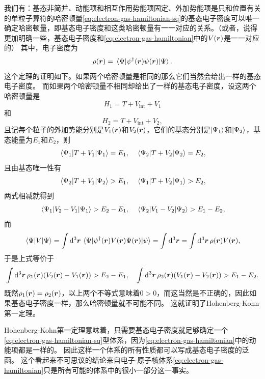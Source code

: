 我们有：基态非简并、动能项和相互作用势能项固定、外加势能项是只和位置有关的单粒子算符的哈密顿量\eqref{eq:electron-gas-hamiltonian-sq}的基态电子密度可以唯一确定哈密顿量，即基态电子密度和这类哈密顿量有一一对应的关系。（或者，说得更加明确一些，基态电子密度和\eqref{eq:electron-gas-hamiltonian}中的$V(\vb*{r})$是一一对应的）
其中，电子密度为
\begin{equation}
    \rho(\vb*{r}) = \mel{\Psi}{{\psi}^\dagger(\vb*{r}) {\psi}(\vb*{r})}{\Psi}.
\end{equation}
这个定理的证明如下。如果两个哈密顿量是相同的那么它们当然会给出一样的基态电子密度。
而如果两个哈密顿量不相同却给出了一样的基态电子密度，设这两个哈密顿量是
\[
    {H}_1 = {T} + {V}_\text{int} + {V}_1
\]
和
\[
    {H}_2 = {T} + {V}_\text{int} + {V}_2,
\]
且记每个粒子的外加势能分别是$V_1(\vb*{r})$和$V_2(\vb*{r})$，它们的基态分别是$\ket{\Psi_1}$和$\ket{\Psi_2}$，基态能量为$E_1$和$E_2$，则
\[
    \mel{\Psi_1}{{T} + {V}_1}{\Psi_1} = E_1, \quad \mel{\Psi_2}{{T} + {V}_2}{\Psi_2} = E_2,
\]
且由基态唯一性有
\[
    \mel{\Psi_2}{{T} + {V}_1}{\Psi_2} > E_1, \quad \mel{\Psi_1}{{T} + {V}_2}{\Psi_1} > E_2,
\]
两式相减就得到
\[
    \mel{\Psi_1}{{V}_2 - {V}_1}{\Psi_1} > E_2 - E_1, \quad \mel{\Psi_2}{{V}_1 - {V}_2}{\Psi_2} > E_1 - E_2,
\]
而
\[
    \mel{\Psi}{{V}}{\Psi} = \int \dd[3]{\vb*{r}} \mel{\Psi}{{\psi}^\dagger(\vb*{r}) V(\vb*{r}) {\Psi}(\vb*{r})}{\psi} = \int \dd[3]{\vb*{r}} = \int \dd[3]{\vb*{r}} \rho(\vb*{r}) V(\vb*{r}),
\]
于是上式等价于
\[
    \int \dd[3]{\vb*{r}} \rho_1(\vb*{r}) (V_2(\vb*{r}) - V_1(\vb*{r})) > E_2 - E_1, \quad \int \dd[3]{\vb*{r}} \rho_2(\vb*{r}) (V_1(\vb*{r}) - V_2(\vb*{r})) > E_1 - E_2.
\]
既然$\rho_1(\vb*{r}) = \rho_2(\vb*{r})$，以上两个不等式意味着$0 > 0$，而这当然是不正确的，因此如果基态电子密度一样，那么哈密顿量就不可能不同。
这就证明了Hohenberg-Kohn第一定理。

Hohenberg-Kohn第一定理意味着，只需要基态电子密度就足够确定一个\eqref{eq:electron-gas-hamiltonian-sq}型体系，因为\eqref{eq:electron-gas-hamiltonian}中的动能项都是一样的。
因此这样一个体系的所有性质都可以写成基态电子密度的泛函。
这个看起来不可思议的结论来自电子-原子核体系\eqref{eq:electron-gas-hamiltonian}只是所有可能的体系中的很小一部分这一事实。

